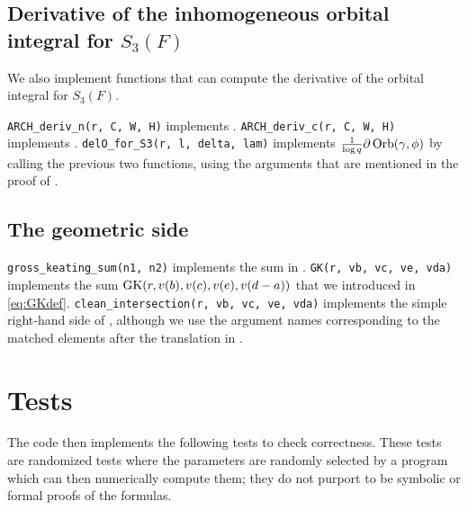 \subsection{Derivative of the inhomogeneous orbital integral for $S_3(F)$}
We also implement functions that can compute the
derivative of the orbital integral for $S_3(F)$.

\begin{itemize}
  \ii \texttt{ARCH\_deriv\_n(r, C, W, H)} implements .
  \ii \texttt{ARCH\_deriv\_c(r, C, W, H)} implements .
  \ii \texttt{delO\_for\_S3(r, l, delta, lam)} implements
  $\frac{1}{\log q}\partial\operatorname{Orb}(\gamma, \phi)$
  by calling the previous two functions,
  using the arguments that are mentioned in the proof of .
\end{itemize}

\subsection{The geometric side}
\begin{itemize}
  \ii \texttt{gross\_keating\_sum(n1, n2)} implements the sum in .
  \ii \texttt{GK(r, vb, vc, ve, vda)} implements the sum $\operatorname{GK}(r, v(b), v(c), v(e), v(d-a))$
  that we introduced in \eqref{eq:GKdef}.
  \ii \texttt{clean\_intersection(r, vb, vc, ve, vda)} implements the simple right-hand side of
  ,
  although we use the argument names corresponding to the matched elements
  after the translation in .
\end{itemize}

\section{Tests}
The code then implements the following tests to check correctness.
These tests are randomized tests where the parameters are randomly selected by a program
which can then numerically compute them;
they do not purport to be symbolic or formal proofs of the formulas.


